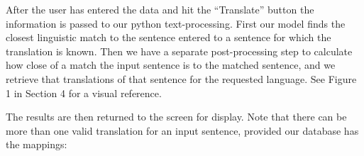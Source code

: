 \documentclass[runningheads]{llncs}
\begin{document}
	\begin{minipage}{\linewidth}
		\begin{center}
  			 \noindent{}
			\label{fig:Language Input}
			\vspace*{1cm}
		\end{center}
	\end{minipage}
	\afterpage{\clearpage}

After the user has entered the data and hit the ``Translate'' button the information is passed to our python text-processing. First our model finds the closest linguistic match to the sentence entered to a sentence for which the translation is known. Then we have a separate post-processing step to calculate how close of a match the input sentence is to the matched sentence, and we retrieve that translations of that sentence for the requested language. See Figure 1 in Section 4 for a visual reference.

The results are then returned to the screen for display. Note that there can be more than one valid translation for an input sentence, provided our database has the mappings:
\end{document}
